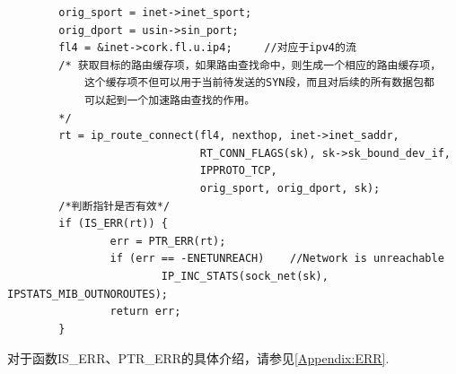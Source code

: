 \begin{verbatim}
        orig_sport = inet->inet_sport;
        orig_dport = usin->sin_port;
        fl4 = &inet->cork.fl.u.ip4;     //对应于ipv4的流
        /* 获取目标的路由缓存项，如果路由查找命中，则生成一个相应的路由缓存项，
            这个缓存项不但可以用于当前待发送的SYN段，而且对后续的所有数据包都
            可以起到一个加速路由查找的作用。
        */
        rt = ip_route_connect(fl4, nexthop, inet->inet_saddr,
                              RT_CONN_FLAGS(sk), sk->sk_bound_dev_if,
                              IPPROTO_TCP,
                              orig_sport, orig_dport, sk);
        /*判断指针是否有效*/        
        if (IS_ERR(rt)) {
                err = PTR_ERR(rt);
                if (err == -ENETUNREACH)    //Network is unreachable
                        IP_INC_STATS(sock_net(sk), IPSTATS_MIB_OUTNOROUTES);
                return err;
        }
\end{verbatim}

        对于函数IS\_ERR、PTR\_ERR的具体介绍，请参见\ref{Appendix:ERR}.

